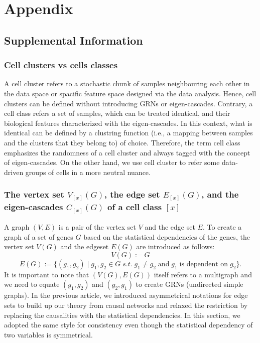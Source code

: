 \documentclass{article}
\title{\empty}
\author{\empty}
\date{\empty}
\begin{document}
\maketitle

\section*{Appendix}
\subsection*{Supplemental Information}
\subsubsection*{Cell clusters vs cells classes}
A cell cluster refers to a stochastic chunk of samples neighbouring each other in the data space or spacific feature 
space designed via the data analysis. Hence, cell clusters can be defined without introducing GRNs or eigen-cascades. 
Contrary, a cell class refers a set of samples, which can be treated identical, and their biological features 
characterized with the eigen-cascades. In this context, what is identical can be defined by a clustring function (i.e., 
a mapping between samples and the clusters that they belong to) of choice. Therefore, the term cell class 
emphasizes the randomness of a cell cluster and always tagged with the concept of eigen-cascades. On the other hand, 
we use cell cluster to refer some data-driven groups of cells in a more neutral nuance.

\subsubsection*{
  The vertex set $V_{[x]}(G)$, the edge set $E_{[x]}(G)$, and the eigen-cascades $C_{[x]}(G)$ of a cell class $[x]$
}
A graph $(V, E)$ is a pair of the vertex set $V$ and the edge set $E$. To create a graph of a 
set of genes $G$ based on the statistical dependencies of the genes, the vertex set $V(G)$ and the 
edgeset $E(G)$ are introduced as follows:
\begin{equation}\label{V}
  V(G):=G
\end{equation}
\begin{equation}\label{E}
  E(G):=\{(g_1, g_2)\;|\;g_1,g_2\in G\; s.t. \;g_1\neq g_2\;\text{and}\; g_1\;\text{is dependent on}\;g_2\}.
\end{equation}
It is important to note that $(V(G),E(G))$ itself refers to a multigraph and we need to equate $(g_1,g_2)$ 
and $(g_2,g_1)$ to create GRNs (undirected simple graphs). In the previous article, we introduced 
asymmetrical notations for edge sets to build up our theory from causal networks and relaxed 
the restriction by replacing the causalities with the statistical dependencies. In this section, 
we adopted the same style for consistency even though the statistical dependency of two variables is symmetrical.
\end{document}
